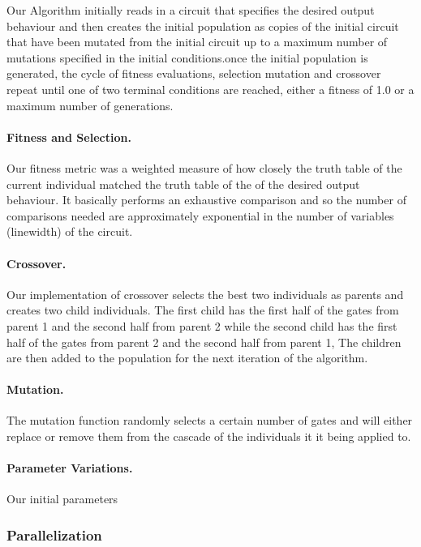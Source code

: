 Our Algorithm initially reads in a circuit that specifies the desired output behaviour and then creates the initial population as copies 
of the initial circuit that have been mutated from the initial circuit up to a maximum number of mutations specified in the initial 
conditions.once the initial population is generated, the cycle of fitness evaluations, selection mutation and crossover repeat until 
one of two terminal conditions are reached, either a fitness of 1.0 or a maximum number of generations.

\paragraph{Fitness and Selection.} 

Our fitness metric was a weighted measure of how closely the truth table of the current individual matched the truth table of the of 
the desired output behaviour. It basically performs an exhaustive comparison and so the number of comparisons needed are approximately
 exponential in the number of variables (linewidth) of the circuit.  


\paragraph{Crossover.}

Our implementation of crossover selects the best two individuals as parents and creates two child individuals. The first child has the 
first half of the gates from parent 1 and the second half from parent 2 while the second child has the first half of the gates from 
parent 2 and the second half from parent 1, The children are then added to the population for the next iteration of the algorithm. 

\paragraph{Mutation.}

The mutation function randomly selects a certain number of gates and will either replace or remove them from the cascade of the 
individuals it it being applied to.

\paragraph{Parameter Variations.}

Our initial parameters


\subsubsection{Parallelization}

